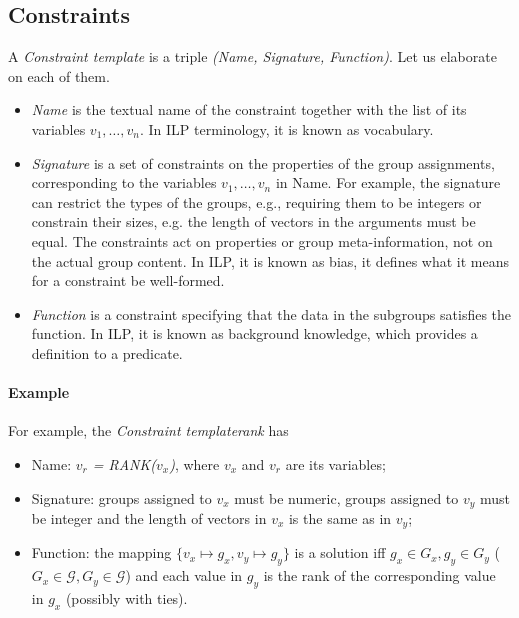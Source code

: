 \documentclass{ecai}
\newcommand{\format}[1]{\textit{#1}\xspace}
\newcommand{\template}{\format{Constraint template}}
\newcommand{\CName}{Name\xspace}
\newcommand{\CSignature}{Signature\xspace}
\newcommand{\CFunction}{Function\xspace}
\newcommand{\groups}{\ensuremath{\mathcal{G}}\xspace}
\begin{document}
\subsection{Constraints}
A \template is a triple \textit{(\CName, \CSignature, \CFunction)}.
Let us elaborate on each of them. 
\begin{itemize}
\item
\textit{\CName} is the textual name of the constraint together with the list of its variables $v_1,\dots,v_n$.  In ILP terminology, it is known as vocabulary.
\item
  \textit{\CSignature} is a set of constraints on the properties of the group assignments, corresponding to the variables $v_1,\dots,v_n$ in \CName.
  For example, the signature can restrict the types of the groups, e.g., requiring them to be integers or constrain their sizes, e.g. the length of vectors in the arguments must be equal.
  The constraints act on properties or group meta-information, not on the actual group content. In ILP, it is known as bias, it defines what it means for a constraint be well-formed.
  \item \textit{\CFunction} is a constraint specifying that the data in the subgroups satisfies the function. In ILP, it is known as background knowledge, which provides a definition to a predicate.
\end{itemize}

\paragraph{Example}
  For example, the \template \textit{rank} has
\begin{itemize}
\item \CName: \textit{$v_r$ = RANK($v_x$)}, where $v_x$ and $v_r$ are its variables;
\item \CSignature: groups assigned to $v_x$ must be numeric, groups assigned to $v_y$ must be integer and the length of vectors in $v_x$ is the same as in $v_y$;
\item \CFunction: the mapping $\{ v_x \mapsto g_x, v_y \mapsto g_y \}$ is a solution iff $g_x \in G_x, g_y \in G_y$ ($G_x \in \groups, G_y \in \groups$) and each value in $g_y$ is the rank of the corresponding value in $g_x$ (possibly with ties).
\end{itemize}
\end{document}
